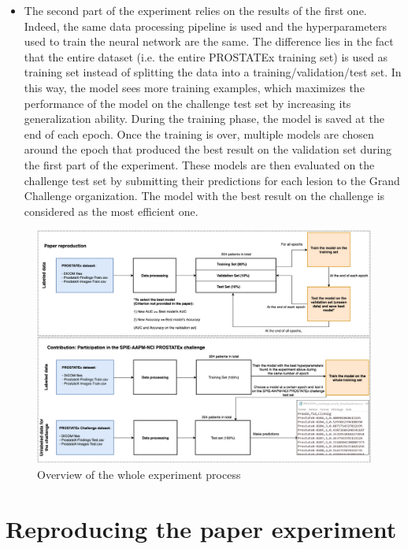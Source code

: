 \begin{itemize}
\item The second part of the experiment relies on the results of the first one. Indeed, the same data processing pipeline is used and the hyperparameters used to train the neural network are the same. The difference lies in the fact that the entire dataset (i.e. the entire PROSTATEx training set) is used as training set instead of splitting the data into a training/validation/test set. In this way, the model sees more training examples, which maximizes the performance of the model on the challenge test set by increasing its generalization ability. During the training phase, the model is saved at the end of each epoch. Once the training is over, multiple models are chosen around the epoch that produced the best result on the validation set during the first part of the experiment. These models are then evaluated on the challenge test set by submitting their predictions for each lesion to the Grand Challenge organization. The model with the best result on the challenge is considered as the most efficient one.
\end{itemize}
\clearpage

\begin{figure}[!t]
\centering
\includegraphics[width=1\textwidth, keepaspectratio=true]{./figures/paper_reproduction_process.png}
\caption{Overview of the whole experiment process}
\label{fig:paper_reproduction_process}
\end{figure}

\section{Reproducing the paper experiment}

